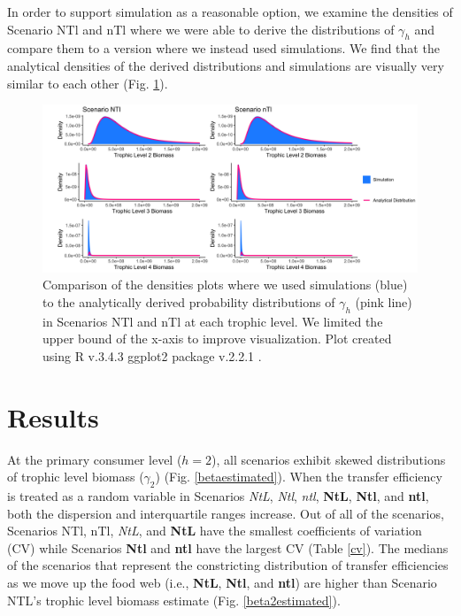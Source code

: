 \documentclass[oneside,12pt,final]{sty/ucthesis-CA2012}
\let\cite\citep                             %
\begin{document}
\begin{mainmatter}
\vspace{5mm}

In order to support simulation as a reasonable option, we examine the densities of Scenario NTl and nTl where we were able to derive the distributions of $\gamma_h$ and compare them to a version where we instead used simulations. We find that the analytical densities of the derived distributions and simulations are visually very similar to each other (Fig. \ref{scen1and4distsim}). 

\begin{figure}[H]
     \centering
       \includegraphics[width=\textwidth]{fig/scen4and7distsim}
    \caption{Comparison of the densities plots where we used simulations (blue) to the analytically derived probability distributions of $\gamma_h$ (pink line) in Scenarios NTl and nTl at each trophic level. We limited the upper bound of the x-axis to improve visualization. Plot created using R v.3.4.3 \cite{Rcite} ggplot2 package v.2.2.1 \cite{ggplot}. }
    \label{scen1and4distsim}
\end{figure}


\section{Results}
At the primary consumer level ($h=2$), all scenarios exhibit skewed distributions of trophic level biomass ($\gamma_2$) (Fig. \ref{betaestimated}).  When the transfer efficiency is treated as a random variable in Scenarios \textit{NtL}, \textit{Ntl}, \textit{ntl}, \textbf{NtL}, \textbf{Ntl}, and \textbf{ntl}, both the dispersion and interquartile ranges increase. Out of all of the scenarios, Scenarios NTl, nTl, \textit{NtL}, and \textbf{NtL} have the smallest coefficients of variation (CV) while Scenarios \textbf{Ntl} and \textbf{ntl} have the largest CV (Table \ref{cv}). The medians of the scenarios that represent the constricting distribution of transfer efficiencies as we move up the food web (i.e., \textbf{NtL}, \textbf{Ntl}, and \textbf{ntl}) are higher than Scenario NTL's trophic level biomass estimate (Fig. \ref{beta2estimated}).   


\end{mainmatter}
\end{document}
